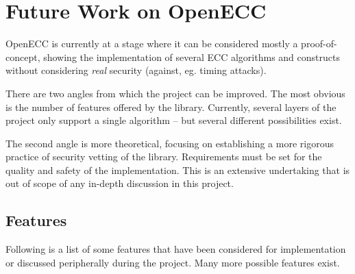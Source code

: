 \section{Future Work on OpenECC}

OpenECC is currently at a stage where it can be considered mostly a proof-of-concept, showing the implementation
of several ECC algorithms and constructs without considering \emph{real} security (against, eg. timing attacks).

There are two angles from which the project can be improved. The most obvious is the number of features offered by
the library. Currently, several layers of the project only support a single algorithm -- but several different
possibilities exist.

The second angle is more theoretical, focusing on establishing a more rigorous practice of security vetting of the
library. Requirements must be set for the quality and safety of the implementation. This is an extensive undertaking
that is out of scope of any in-depth discussion in this project.

\subsection{Features}

Following is a list of some features that have been considered for implementation or discussed peripherally during the
project. Many more possible features exist.

